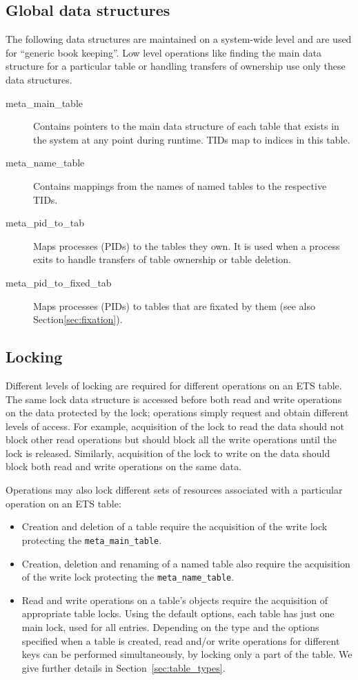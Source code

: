 \documentclass[aps,pre,preprint,nofootinbib]{revtex4}
\begin{document}
\subsection{Global data structures}
\label{sec:tables_overview}

The following data structures are maintained on a system-wide level and are used for ``generic book keeping''.
Low level operations like finding the main data structure for a particular table or handling transfers of ownership use only these data structures.

\begin{description}
\item[meta\_main\_table]
  Contains pointers to the main data structure of each table that exists in the system at any point during runtime.
  TIDs map to indices in this table.
\item[meta\_name\_table]
  Contains mappings from the names of named tables to the respective TIDs.
\item[meta\_pid\_to\_tab]
  Maps processes (PIDs) to the tables they own.
  It is used when a process exits to handle transfers of table ownership or table deletion.
\item[meta\_pid\_to\_fixed\_tab]
  Maps processes (PIDs) to tables that are fixated by them (see also Section\ref{sec:fixation}).
\end{description}

\subsection{Locking} \label{sec:tables_locking}

Different levels of locking are required for different operations on an ETS table.
The same lock data structure is accessed before both read and write operations on the data protected by the lock; operations simply request and obtain different levels of access.
For example, acquisition of the lock to read the data should not block other read operations but should block all the write operations until the lock is released.
Similarly, acquisition of the lock to write on the data should block both read and write operations on the same data.

Operations may also lock different sets of resources associated with a particular operation on an ETS table:
\begin{itemize}
\item Creation and deletion of a table require the acquisition of the write lock protecting the \verb|meta_main_table|.
\item Creation, deletion and renaming of a named table also require the acquisition of the write lock protecting the \verb|meta_name_table|.
\item Read and write operations on a table's objects require the acquisition of appropriate table locks.
  Using the default options, each table has just one main lock, used for all entries.
  Depending on the type and the options specified when a table is created, read and/or write operations for different keys can be performed simultaneously, by locking only a part of the table.
  We give further details in Section~\ref{sec:table_types}.
\end{itemize}
\end{document}
